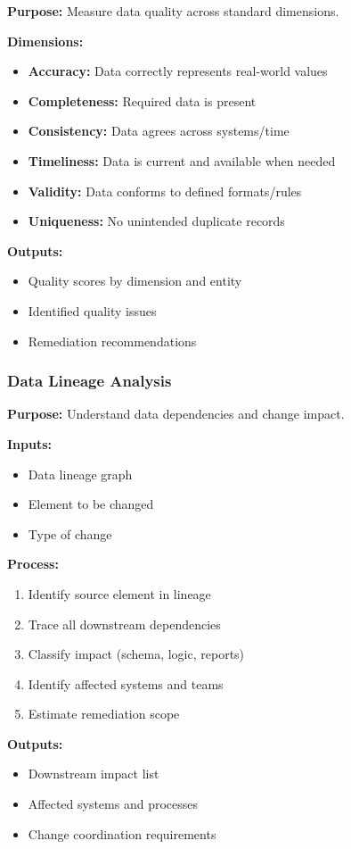 \documentclass[11pt,letterpaper]{article}
\begin{document}
\begin{definitionbox}
\textbf{Purpose:} Measure data quality across standard dimensions.

\textbf{Dimensions:}
\begin{itemize}[nosep]
    \item \textbf{Accuracy:} Data correctly represents real-world values
    \item \textbf{Completeness:} Required data is present
    \item \textbf{Consistency:} Data agrees across systems/time
    \item \textbf{Timeliness:} Data is current and available when needed
    \item \textbf{Validity:} Data conforms to defined formats/rules
    \item \textbf{Uniqueness:} No unintended duplicate records
\end{itemize}

\textbf{Outputs:}
\begin{itemize}[nosep]
    \item Quality scores by dimension and entity
    \item Identified quality issues
    \item Remediation recommendations
\end{itemize}
\end{definitionbox}

\subsubsection{Data Lineage Analysis}

\begin{definitionbox}
\textbf{Purpose:} Understand data dependencies and change impact.

\textbf{Inputs:}
\begin{itemize}[nosep]
    \item Data lineage graph
    \item Element to be changed
    \item Type of change
\end{itemize}

\textbf{Process:}
\begin{enumerate}[nosep]
    \item Identify source element in lineage
    \item Trace all downstream dependencies
    \item Classify impact (schema, logic, reports)
    \item Identify affected systems and teams
    \item Estimate remediation scope
\end{enumerate}

\textbf{Outputs:}
\begin{itemize}[nosep]
    \item Downstream impact list
    \item Affected systems and processes
    \item Change coordination requirements
\end{itemize}
\end{definitionbox}
\end{document}
